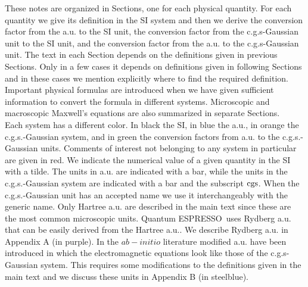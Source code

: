 \documentclass[12pt,a4paper,twoside]{report}
\def\qe{{\sc Quantum ESPRESSO}}
\begin{document}
These notes are organized in Sections, one for each physical quantity. 
For each quantity we give its definition in the SI system and then we derive 
the conversion factor from the a.u. to the SI unit, the conversion 
factor from the c.g.s-Gaussian unit to the SI unit, and the conversion 
factor from the a.u. to the c.g.s-Gaussian unit. The text in each Section 
depends on the definitions given in previous Sections. Only in a few cases 
it depends on definitions given in following Sections and in these cases 
we mention explicitly where to find the required definition. Important 
physical formulas are introduced when we have given sufficient information to
convert the formula in different systems. Microscopic and macroscopic 
Maxwell's equations are also summarized in separate Sections. \\
Each system has a different color. In black the SI, in blue the a.u., in 
orange the c.g.s.-Gaussian system, 
and in green the conversion factors from a.u. to the c.g.s.-Gaussian units. 
Comments of interest not belonging to any system in particular are given 
in red. We indicate the numerical value of a given quantity in the SI 
with a tilde. The units in a.u. are indicated with a bar, while the units 
in the c.g.s.-Gaussian system are indicated with a bar and the subscript 
${\rm cgs}$. When the c.g.s.-Gaussian unit has an accepted name we use it 
interchangeably with the generic name. Only Hartree a.u. are described 
in the main text since these are the most common microscopic units. 
\qe\ uses Rydberg a.u. that can be easily derived from the Hartree
a.u.. We describe Rydberg a.u. in Appendix A (in purple). In the $ab-initio$
literature modified a.u. have been introduced in which the 
electromagnetic equations look like those of the c.g.s-Gaussian system. 
This requires some modifications to the definitions given in the main 
text and we discuss these units in Appendix B (in steelblue).
\end{document}
